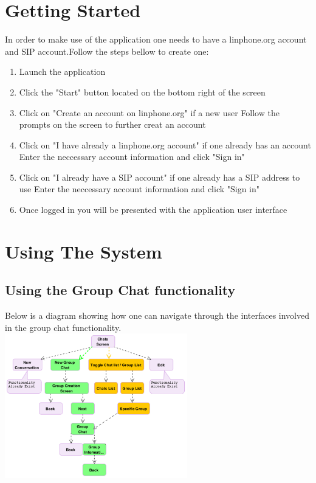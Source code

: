 \documentclass[11pt]{article}
\begin{document}
\section{Getting Started}
In order to make use of the application one needs to have a linphone.org account and SIP account.Follow the steps bellow to create one:
\begin{enumerate}
\item Launch the application
\item Click the "Start" button located on the bottom right of the screen
\item Click on "Create an account on linphone.org" if a new user 
\subitem Follow the prompts on the screen to further creat an account
\item Click on "I have already a linphone.org account" if one already has an account
\subitem Enter the neccessary account information and click "Sign in"
\item Click on "I already have a SIP account" if one already has a SIP address to use
\subitem Enter the neccessary account information and click "Sign in"
\item Once logged in you will be presented with the application user interface
\end{enumerate}

\section{Using The System}
\subsection*{Using the Group Chat functionality}
Below is a diagram showing how one can navigate through the interfaces involved in the group chat functionality. \\
\includegraphics[width=300px]{./images/flow.png}
\end{document}
